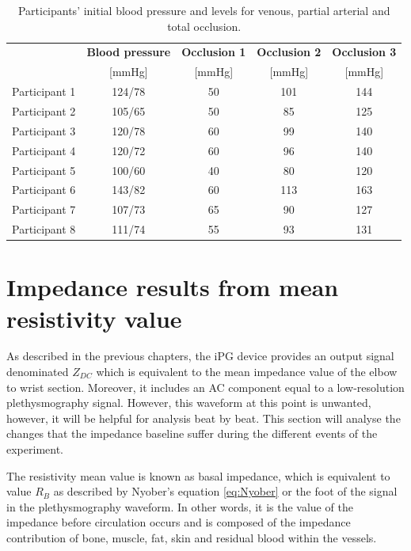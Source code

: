 \begin{table}[!htbp] %
	\caption{Participants' initial blood pressure and levels for venous, partial arterial and total occlusion.}
	\label{tbl:occlusions}
	\centering
	\begin{tabular}    {lcccc}
		\toprule
		& \textbf{Blood pressure}  &  \textbf{Occlusion 1}   & \textbf{Occlusion 2}  &  \textbf{Occlusion 3} \\
		&  [\si{\mmHg}]   &        [\si{\mmHg}]  &    [\si{\mmHg}]   &  [\si{\mmHg}]\\ \midrule
		Participant 1  &  124/78   &        50  &    101   &  144\\ 
		Participant 2  &  105/65   &        50  &     85   &  125 \\
		Participant 3  &  120/78   &        60  &     99   &  140 \\
		Participant 4  &  120/72   &        60  &     96   &  140 \\
		Participant 5  &  100/60   &        40  &     80   &  120 \\
		Participant 6  &  143/82   &        60  &    113   &  163 \\
		Participant 7  &  107/73   &        65  &     90   &  127 \\
		Participant 8  &  111/74   &        55  &     93   &  131 \\\bottomrule
	\end{tabular}
\end{table}


\section{Impedance results from mean resistivity value}
\label{section results 2}
As described in the previous chapters, the iPG device provides an output signal denominated $Z_{DC}$ which is equivalent to the mean impedance value of the elbow to wrist section. Moreover, it includes an AC component equal to a low-resolution plethysmography signal. However, this waveform at this point is unwanted, however, it will be helpful for analysis beat by beat. This section will analyse the changes that the impedance baseline suffer during the different events of the experiment.

The resistivity mean value is known as basal impedance, which is equivalent to value $R_B$ as described by Nyober's equation \ref{eq:Nyober} or the foot of the signal in the plethysmography waveform. In other words, it is the value of the impedance before circulation occurs and is composed of the impedance contribution of bone, muscle, fat, skin and residual blood within the vessels.

